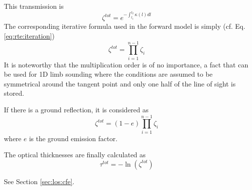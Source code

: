 This transmission is
 \begin{equation}
   \zeta^{tot} = e^{-\int_{l_1}^{l_2}{\kappa(l)dl}}
  \label{eq:rte:tottrans}
 \end{equation}
 The corresponding iterative formula used in the forward model is
 simply (cf. Eq. \ref{eq:rte:iteration})
 \begin{equation}
   \zeta^{tot} = \prod_{i=1}^{n-1}\zeta_{i}
 \end{equation} 
 It is noteworthy that the multiplication order
 is of no importance, a fact that can be used for 1D limb sounding where
 the conditions are assumed to be symmetrical around the tangent point and
 only one half of the line of sight is stored. 

 If there is a ground reflection, it is considered as
 \begin{equation}
   \zeta^{tot} = (1-e)\prod_{i=1}^{n-1}\zeta_{i}
  \label{eq:rte:tground}
 \end{equation} 
 where $e$ is the ground emission factor. 

 The optical thicknesses are finally calculated as
 \begin{equation}
   \tau^{tot} = -\ln(\zeta^{tot})
  \label{eq:rte:odepth}
 \end{equation} 

 

  \label{sec:rte:cfe}
 
  See Section \ref{sec:los:cfe}.



